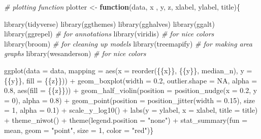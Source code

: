 \documentclass[a4paper,nobind]{templates/ociamthesis}
\newenvironment{Shaded}{\begin{snugshade}}{\end{snugshade}}
\newcommand{\AttributeTok}[1]{\textcolor[rgb]{0.77,0.63,0.00}{#1}}
\newcommand{\CommentTok}[1]{\textcolor[rgb]{0.56,0.35,0.01}{\textit{#1}}}
\newcommand{\ConstantTok}[1]{\textcolor[rgb]{0.00,0.00,0.00}{#1}}
\newcommand{\ControlFlowTok}[1]{\textcolor[rgb]{0.13,0.29,0.53}{\textbf{#1}}}
\newcommand{\DecValTok}[1]{\textcolor[rgb]{0.00,0.00,0.81}{#1}}
\newcommand{\FloatTok}[1]{\textcolor[rgb]{0.00,0.00,0.81}{#1}}
\newcommand{\FunctionTok}[1]{\textcolor[rgb]{0.00,0.00,0.00}{#1}}
\newcommand{\NormalTok}[1]{#1}
\newcommand{\OtherTok}[1]{\textcolor[rgb]{0.56,0.35,0.01}{#1}}
\newcommand{\SpecialCharTok}[1]{\textcolor[rgb]{0.00,0.00,0.00}{#1}}
\newcommand{\StringTok}[1]{\textcolor[rgb]{0.31,0.60,0.02}{#1}}
\renewenvironment{Shaded}
{
  \vspace{10pt}%
  \begin{snugshade}%
}{%
  \end{snugshade}%
  \vspace{8pt}%
}
\begin{document}
\begin{Shaded}
\begin{Highlighting}[]
\CommentTok{\# plotting function}
\NormalTok{plotter }\OtherTok{\textless{}{-}} \ControlFlowTok{function}\NormalTok{(data, x , y, z, xlabel, ylabel, title)\{}
  
  \FunctionTok{library}\NormalTok{(tidyverse)}
  \FunctionTok{library}\NormalTok{(ggthemes)}
  \FunctionTok{library}\NormalTok{(gghalves)}
  \FunctionTok{library}\NormalTok{(ggalt)  }
  \FunctionTok{library}\NormalTok{(ggrepel)  }\CommentTok{\# for annotations}
  \FunctionTok{library}\NormalTok{(viridis)  }\CommentTok{\# for nice colors}
  \FunctionTok{library}\NormalTok{(broom)  }\CommentTok{\# for cleaning up models}
  \FunctionTok{library}\NormalTok{(treemapify)  }\CommentTok{\# for making area graphs}
  \FunctionTok{library}\NormalTok{(wesanderson)  }\CommentTok{\# for nice colors}
  
  \FunctionTok{ggplot}\NormalTok{(}\AttributeTok{data =}\NormalTok{ data, }\AttributeTok{mapping =} \FunctionTok{aes}\NormalTok{(}\AttributeTok{x =} \FunctionTok{reorder}\NormalTok{(\{\{x\}\}, \{\{y\}\}, median\_n), }
  \AttributeTok{y =}\NormalTok{ \{\{y\}\}, }\AttributeTok{fill =}\NormalTok{ \{\{z\}\})) }\SpecialCharTok{+} 
  \FunctionTok{geom\_boxplot}\NormalTok{(}\AttributeTok{width =} \FloatTok{0.2}\NormalTok{, }\AttributeTok{outlier.shape =} \ConstantTok{NA}\NormalTok{, }\AttributeTok{alpha =} \FloatTok{0.8}\NormalTok{, }\FunctionTok{aes}\NormalTok{(}\AttributeTok{fill =}\NormalTok{ \{\{z\}\})) }\SpecialCharTok{+}
  \FunctionTok{geom\_half\_violin}\NormalTok{(}\AttributeTok{position =} \FunctionTok{position\_nudge}\NormalTok{(}\AttributeTok{x =} \FloatTok{0.2}\NormalTok{, }\AttributeTok{y =} \DecValTok{0}\NormalTok{), }\AttributeTok{alpha =} \FloatTok{0.8}\NormalTok{) }\SpecialCharTok{+} 
    \FunctionTok{geom\_point}\NormalTok{(}\AttributeTok{position =} \FunctionTok{position\_jitter}\NormalTok{(}\AttributeTok{width =} \FloatTok{0.15}\NormalTok{), }\AttributeTok{size =} \DecValTok{1}\NormalTok{, }\AttributeTok{alpha =} \FloatTok{0.1}\NormalTok{) }\SpecialCharTok{+} 
    \FunctionTok{scale\_y\_log10}\NormalTok{() }\SpecialCharTok{+} \FunctionTok{labs}\NormalTok{(}\AttributeTok{y =}\NormalTok{ ylabel, }\AttributeTok{x =}\NormalTok{ xlabel, }
  \AttributeTok{title =}\NormalTok{ title) }\SpecialCharTok{+} 
  \FunctionTok{theme\_niwot}\NormalTok{() }\SpecialCharTok{+} 
  \FunctionTok{theme}\NormalTok{(}\AttributeTok{legend.position =} \StringTok{"none"}\NormalTok{) }\SpecialCharTok{+} 
  \FunctionTok{stat\_summary}\NormalTok{(}\AttributeTok{fun =}\NormalTok{ mean, }\AttributeTok{geom =} \StringTok{"point"}\NormalTok{, }
                \AttributeTok{size =} \DecValTok{1}\NormalTok{, }\AttributeTok{color =} \StringTok{"red"}\NormalTok{)\}}


\end{Highlighting}
\end{Shaded}
\end{document}
